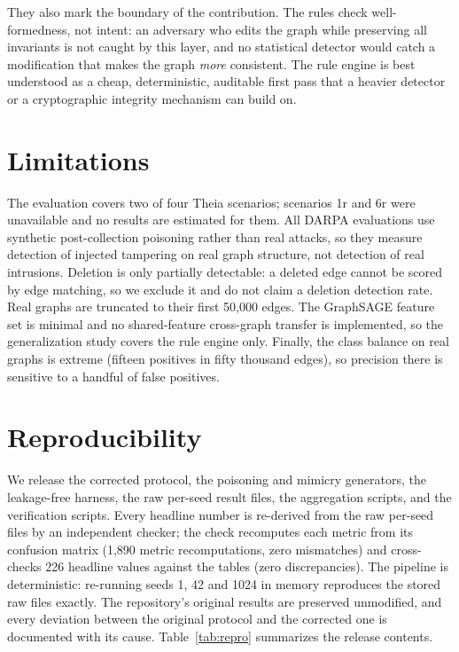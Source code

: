 \documentclass[journal]{IEEEtran}
\begin{document}
They also mark the boundary of the contribution. The rules check
well-formedness, not intent: an adversary who edits the graph while preserving
all invariants is not caught by this layer, and no statistical detector would
catch a modification that makes the graph \emph{more} consistent. The rule engine
is best understood as a cheap, deterministic, auditable first pass that a
heavier detector or a cryptographic integrity mechanism can build on.

\section{Limitations}
The evaluation covers two of four Theia scenarios; scenarios 1r and 6r were
unavailable and no results are estimated for them. All DARPA evaluations use
synthetic post-collection poisoning rather than real attacks, so they measure
detection of injected tampering on real graph structure, not detection of real
intrusions. Deletion is only partially detectable: a deleted edge cannot be
scored by edge matching, so we exclude it and do not claim a deletion detection
rate. Real graphs are truncated to their first 50{,}000 edges. The GraphSAGE
feature set is minimal and no shared-feature cross-graph transfer is
implemented, so the generalization study covers the rule engine only. Finally,
the class balance on real graphs is extreme (fifteen positives in fifty thousand
edges), so precision there is sensitive to a handful of false positives.

\section{Reproducibility}
\label{sec:repro}
We release the corrected protocol, the poisoning and mimicry generators, the
leakage-free harness, the raw per-seed result files, the aggregation scripts,
and the verification scripts. Every headline number is re-derived from the raw
per-seed files by an independent checker; the check recomputes each metric from
its confusion matrix (1{,}890 metric recomputations, zero mismatches) and
cross-checks 226 headline values against the tables (zero discrepancies). The
pipeline is deterministic: re-running seeds 1, 42 and 1024 in memory reproduces
the stored raw files exactly. The repository's original results are preserved
unmodified, and every deviation between the original protocol and the corrected
one is documented with its cause. Table~\ref{tab:repro} summarizes the release
contents.
\end{document}
